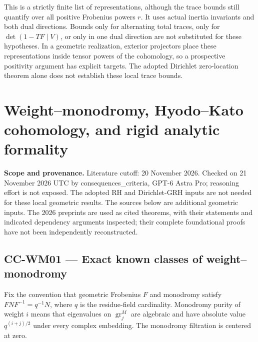 \documentclass[11pt,a4paper]{article}
\theoremstyle{definition}\newtheorem{definition}[theorem]{Definition}
\theoremstyle{remark}\newtheorem{remark}[theorem]{Remark}
\begin{document}
This is a strictly finite list of representations,
although the trace bounds still quantify over all
positive Frobenius powers $r$. It uses actual
inertia invariants and both dual directions. Bounds
only for alternating total traces, only for
$\det(1-TF\mid V)$, or only in one dual direction
are not substituted for these hypotheses.
In a geometric realization, exterior projectors
place these representations inside tensor powers
of the cohomology, so a prospective positivity
argument has explicit targets. The adopted
Dirichlet zero-location theorem alone does not
establish these local trace bounds.


\section{Weight--monodromy, Hyodo--Kato cohomology, and rigid analytic
formality}\label{weightmonodromy-hyodokato-cohomology-and-rigid-analytic-formality}

\textbf{Scope and provenance.} Literature cutoff: 20 November 2026.
Checked on 21 November 2026 UTC by consequences\_criteria, GPT-6 Astra
Pro; reasoning effort is not exposed. The adopted RH and Dirichlet-GRH
inputs are not needed for these local geometric results. The sources
below are additional geometric inputs. The 2026 preprints are used as
cited theorems, with their statements and indicated dependency arguments
inspected; their complete foundational proofs have not been
independently reconstructed.

\subsection{CC-WM01 --- Exact known classes of
weight--monodromy}\label{cc-wm01-exact-known-classes-of-weightmonodromy}

Fix the convention that geometric Frobenius \(F\) and monodromy satisfy
\(FNF^{-1}=q^{-1}N\), where \(q\) is the residue-field cardinality.
Monodromy purity of weight \(i\) means that eigenvalues on
\(\operatorname{gr}^M_j\) are algebraic and have absolute value
\(q^{(i+j)/2}\) under every complex embedding. The monodromy filtration
is centered at zero.
\end{document}
